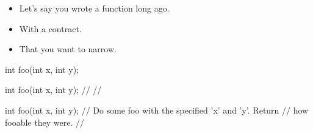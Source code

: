 \begin{frame}[fragile]
  \begin{overprint}
  \begin{itemize}
  \item<1->{Let's say you wrote a function long ago.}
  \item<3->{With a contract.}
  \item<5->{That you want to narrow.}
  \end{itemize}
\end{overprint}

\begin{overprint}
\begin{cppcodebox}
int foo(int x, int y);
\end{cppcodebox}

\begin{cppcodebox}
int foo(int x, int y);
  // 
  // 
\end{cppcodebox}

\begin{cppcodebox}
int foo(int x, int y);
  // Do some foo with the specified 'x' and 'y'.  Return
  // how fooable they were. 
  // 
\end{cppcodebox}

\end{overprint}
\end{frame}

